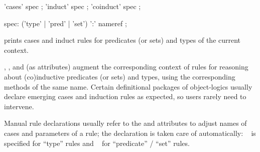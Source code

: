 \begin{isabellebody}
\begin{isamarkuptext}
  \begin{rail}
    'cases' spec
    ;
    'induct' spec
    ;
    'coinduct' spec
    ;

    spec: ('type' | 'pred' | 'set') ':' nameref
    ;
  \end{rail}

  \begin{descr}

  \item [\mbox{\isa{\isacommand{print{\isacharunderscore}induct{\isacharunderscore}rules}}}] prints cases and induct
  rules for predicates (or sets) and types of the current context.
  
  \item [\mbox{\isa{cases}}, \mbox{\isa{induct}}, and \mbox{\isa{coinduct}}] (as attributes) augment the corresponding context of
  rules for reasoning about (co)inductive predicates (or sets) and
  types, using the corresponding methods of the same name.  Certain
  definitional packages of object-logics usually declare emerging
  cases and induction rules as expected, so users rarely need to
  intervene.
  
  Manual rule declarations usually refer to the \mbox{} and \mbox{} attributes to adjust names of
  cases and parameters of a rule; the \mbox{}
  declaration is taken care of automatically: \mbox{}~ is specified for ``type'' rules and \mbox{}~ for ``predicate'' / ``set'' rules.

  \end{descr}%
\end{isamarkuptext}%
\isamarkuptrue%
%
\isadelimtheory
%
\endisadelimtheory
%
\isatagtheory
{}\isamarkupfalse%
%
\endisatagtheory
{\isafoldtheory}%
%
\isadelimtheory
%
\endisadelimtheory
\isanewline
\end{isabellebody}%
